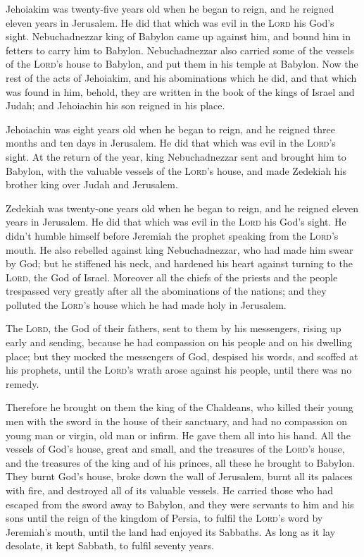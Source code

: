  Jehoiakim was twenty-five years old when he began to
reign, and he reigned eleven years in Jerusalem. He did that which was
evil in the \textsc{Lord} his God's sight.  Nebuchadnezzar
king of Babylon came up against him, and bound him in fetters to carry
him to Babylon.  Nebuchadnezzar also carried some of the
vessels of the \textsc{Lord}'s house to Babylon, and put them in his
temple at Babylon.  Now the rest of the acts of Jehoiakim,
and his abominations which he did, and that which was found in him,
behold, they are written in the book of the kings of Israel and Judah;
and Jehoiachin his son reigned in his place.

 Jehoiachin was eight years old when he began to reign,
and he reigned three months and ten days in Jerusalem. He did that which
was evil in the \textsc{Lord}'s sight.  At the return of
the year, king Nebuchadnezzar sent and brought him to Babylon, with the
valuable vessels of the \textsc{Lord}'s house, and made Zedekiah his
brother king over Judah and Jerusalem.

 Zedekiah was twenty-one years old when he began to
reign, and he reigned eleven years in Jerusalem.  He did
that which was evil in the \textsc{Lord} his God's sight. He didn't
humble himself before Jeremiah the prophet speaking from the
\textsc{Lord}'s mouth.  He also rebelled against king
Nebuchadnezzar, who had made him swear by God; but he stiffened his
neck, and hardened his heart against turning to the \textsc{Lord}, the
God of Israel.  Moreover all the chiefs of the priests
and the people trespassed very greatly after all the abominations of the
nations; and they polluted the \textsc{Lord}'s house which he had made
holy in Jerusalem.

 The \textsc{Lord}, the God of their fathers, sent to
them by his messengers, rising up early and sending, because he had
compassion on his people and on his dwelling place;  but
they mocked the messengers of God, despised his words, and scoffed at
his prophets, until the \textsc{Lord}'s wrath arose against his people,
until there was no remedy.

 Therefore he brought on them the king of the Chaldeans,
who killed their young men with the sword in the house of their
sanctuary, and had no compassion on young man or virgin, old man or
infirm. He gave them all into his hand.  All the vessels
of God's house, great and small, and the treasures of the
\textsc{Lord}'s house, and the treasures of the king and of his princes,
all these he brought to Babylon.  They burnt God's house,
broke down the wall of Jerusalem, burnt all its palaces with fire, and
destroyed all of its valuable vessels.  He carried those
who had escaped from the sword away to Babylon, and they were servants
to him and his sons until the reign of the kingdom of Persia,
 to fulfil the \textsc{Lord}'s word by Jeremiah's mouth,
until the land had enjoyed its Sabbaths. As long as it lay desolate, it
kept Sabbath, to fulfil seventy years.

